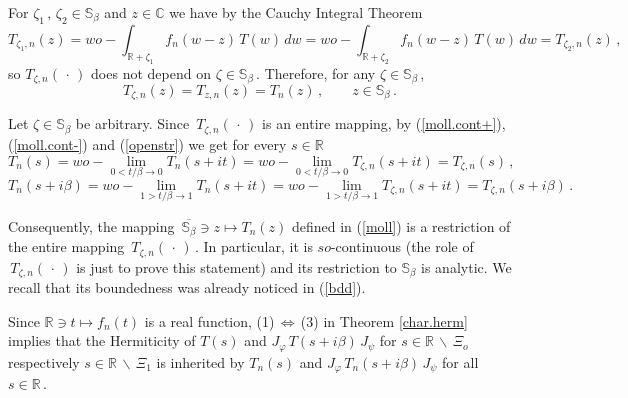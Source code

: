 \documentclass[reqno]{amsart}
\theoremstyle{definition}
\theoremstyle{remark}
\numberwithin{equation}{section}
\theoremstyle{plain}
\begin{document}
For $\zeta_1\, ,\,\zeta_2\in\mathbb S_\beta$ and $z\in\mathbb C$
we have by the Cauchy Integral Theorem
\begin{equation*}
T_{\zeta_1 ,n}(z) =
wo-\int_{\mathbb R +\zeta_1} f_n(w-z)\, T(w)\, dw =
wo-\int_{\mathbb R +\zeta_2} f_n(w-z)\, T(w)\, dw =
T_{\zeta_2 ,n}(z)\, ,
\end{equation*}
so $T_{\zeta ,n}(\,\cdot\, )$ does not depend on $\zeta\in
\mathbb S_\beta\,$. Therefore, for any $\zeta\in\mathbb S_\beta\,$,
\begin{equation}\label{openstr}
T_{\zeta ,n}(z)=T_{z ,n}(z)=T_n(z)\, ,\qquad z\in\mathbb S_\beta\, .
\end{equation}

Let $\zeta\in\mathbb S_\beta$ be arbitrary. Since
$\, T_{\zeta ,n}(\,\cdot\, )$ is an entire mapping, by
(\ref{moll.cont+}), (\ref{moll.cont-}) and (\ref{openstr}) we get
for every $s\in\mathbb R$
\begin{equation*}
T_n(s)=wo - \lim_{0<t/\beta \to 0} T_n(s+it)=
wo - \lim_{0<t/\beta \to 0} T_{\zeta ,n}(s+it)=T_{\zeta ,n}(s)\, ,
\end{equation*}
\begin{equation*}
T_n(s+i\beta )=wo - \lim_{1>t/\beta \to 1} T_n(s+it)=
wo - \lim_{1>t/\beta \to 1} T_{\zeta ,n}(s+it)=
T_{\zeta ,n}(s+i\beta )\, .
\end{equation*}

Consequently, the mapping $\,\overline{\mathbb S_\beta}\ni z
\longmapsto T_n(z)$ defined in (\ref{moll}) is a restriction of the
entire mapping $\, T_{\zeta ,n}(\,\cdot\, )\,$. In particular, it
is $so$-continuous (the role of $\, T_{\zeta ,n}(\,\cdot\, )$ is
just to prove this statement) and its restriction to $\mathbb S_\beta$
is analytic. We recall that its boundedness was already noticed in
(\ref{bdd}). 

Since $\mathbb R\ni t\longmapsto f_n(t)$ is a real function,
(1)$\,\Leftrightarrow\,$(3) in Theorem \ref{char.herm} implies that
the Hermiticity of $T(s)$ and $J_\varphi\, T(s+i\beta )\, J_\psi$
for $s\in\mathbb R\,\backslash\,\Xi_o$ respectively $s\in\mathbb R
\,\backslash\,\Xi_1$ is inherited by $T_n(s)$ and $J_\varphi\,
T_n(s+i\beta )\, J_\psi$ for all $s\in\mathbb R\,$.
\end{document}
